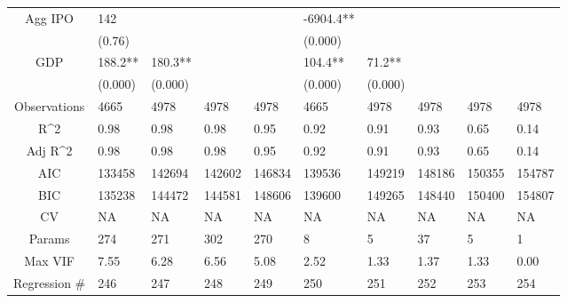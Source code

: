 \documentclass{article}
\begin{document}
\begin{table}[H]
\begin{tabular}{|clllllllll|}
  Agg IPO & 142 &  &  &  & -6904.4** &  &  &  &  \\ 
   & (0.76) &  &  &  & (0.000) &  &  &  &  \\ 
  GDP & 188.2** & 180.3** &  &  & 104.4** & 71.2** &  &  &  \\ 
   & (0.000) & (0.000) &  &  & (0.000) & (0.000) &  &  &  \\ 
  \hline 
 Observations & 4665 & 4978 & 4978 & 4978 & 4665 & 4978 & 4978 & 4978 & 4978 \\ 
  R^2 & 0.98 & 0.98 & 0.98 & 0.95 & 0.92 & 0.91 & 0.93 & 0.65 & 0.14 \\ 
  Adj R^2 & 0.98 & 0.98 & 0.98 & 0.95 & 0.92 & 0.91 & 0.93 & 0.65 & 0.14 \\ 
  AIC & 133458 & 142694 & 142602 & 146834 & 139536 & 149219 & 148186 & 150355 & 154787 \\ 
  BIC & 135238 & 144472 & 144581 & 148606 & 139600 & 149265 & 148440 & 150400 & 154807 \\ 
  CV & NA & NA & NA & NA & NA & NA & NA & NA & NA \\ 
  Params & 274 & 271 & 302 & 270 & 8 & 5 & 37 & 5 & 1 \\ 
  Max VIF & 7.55 & 6.28 & 6.56 & 5.08 & 2.52 & 1.33 & 1.37 & 1.33 & 0.00 \\ 
  Regression \# & 246 & 247 & 248 & 249 & 250 & 251 & 252 & 253 & 254 \\ 
   \hline
\end{tabular}
 
\end{table}
\end{document}

